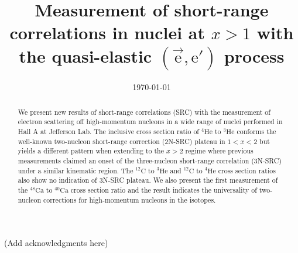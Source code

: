 \documentclass[
reprint, superscriptaddress,
	showpacs,
	amsmath,amssymb,
	aps,
	prl,
	floatfix,
	]{revtex4-1}
\begin{document}
	\title{Measurement of short-range correlations in nuclei at $x>1$ with the quasi-elastic
		$(\vec{\mathrm{e}},\mathrm{e}')$ process}

		

		\date{\today}

		\begin{abstract}
		We present new results of short-range correlations (SRC) with the measurement of electron scattering off high-momentum nucleons in a wide range of nuclei performed in Hall A at Jefferson Lab. The inclusive cross section ratio of $\mathrm{^{4}He}$ to $\mathrm{^{3}He}$ conforms the well-known two-nucleon short-range correction (2N-SRC) plateau in $1<x<2$ but yields a different pattern when extending to the $x>2$ regime where previous measurements claimed an onset of the three-nucleon short-range correlation (3N-SRC) under a similar kinematic region. The $\mathrm{^{12}C}$ to $\mathrm{^{3}He}$ and $\mathrm{^{12}C}$ to $\mathrm{^{4}He}$ cross section ratios also show no indication of 3N-SRC plateau. We also present the first measurement of the $\mathrm{^{48}Ca}$ to $\mathrm{^{40}Ca}$ cross section ratio and the result indicates the universality of two-nucleon corrections for high-momentum nucleons in the isotopes.
		\end{abstract}


		\maketitle

		

		
		

		

		\begin{acknowledgments}
        (Add acknowledgments here)
		\end{acknowledgments}

		
		

		
\end{document}
